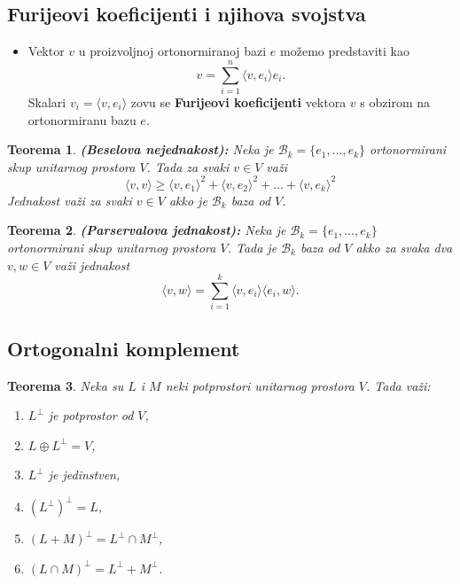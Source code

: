 \documentclass[a4paper,12pt,twoside]{report}
\newtheorem{theorem}{Teorema}[section]
\numberwithin{algorithm}{section}
\begin{document}
\subsection{Furijeovi koeficijenti i njihova svojstva}

\begin{itemize}
    \item Vektor $v$ u proizvoljnoj ortonormiranoj bazi $e$ možemo predstaviti kao
    \[ v = \sum_{i=1}^{n} \langle v, e_i \rangle e_i. \]
    Skalari $v_i = \langle v, e_i \rangle$ zovu se \textbf{Furijeovi koeficijenti} vektora $v$ s obzirom na ortonormiranu bazu $e$.
\end{itemize}

\begin{theorem}
    \textbf{(Beselova nejednakost):} Neka je $\mathcal{B}_k = \{e_1, \dots, e_k\}$ ortonormirani skup unitarnog prostora $V$. Tada za
    svaki $v \in V$ važi
    \[ \langle v, v \rangle \geq \langle v, e_1\rangle^2 + \langle v, e_2\rangle^2 + \dots + \langle v, e_k\rangle^2 \]
    Jednakost važi za svaki $v \in V$ akko je $\mathcal{B}_k$ baza od $V$.
\end{theorem}

\begin{theorem}
    \textbf{(Parservalova jednakost):} Neka je $\mathcal{B}_k = \{e_1, \dots, e_k\}$ ortonormirani skup unitarnog prostora $V$.
    Tada je $\mathcal{B}_k$ baza od $V$ akko za svaka dva $v, w \in V$ važi jednakost
    \[ \langle v, w \rangle = \sum_{i=1}^{k} \langle v, e_i \rangle \langle e_i, w \rangle. \]
\end{theorem}

\subsection{Ortogonalni komplement}
\begin{theorem}
    Neka su $L$ i $M$ neki potprostori unitarnog prostora $V$. Tada važi:
    \begin{enumerate}
        \item $L^\perp$ je potprostor od $V$,
        \item $L \oplus L^\perp = V$,
        \item $L^\perp$ je jedinstven,
        \item $(L^\perp)^\perp = L$,
        \item $(L + M)^\perp = L^\perp \cap M^\perp$,
        \item $(L \cap M)^\perp = L^\perp + M^\perp$.
    \end{enumerate}
\end{theorem}
\end{document}

